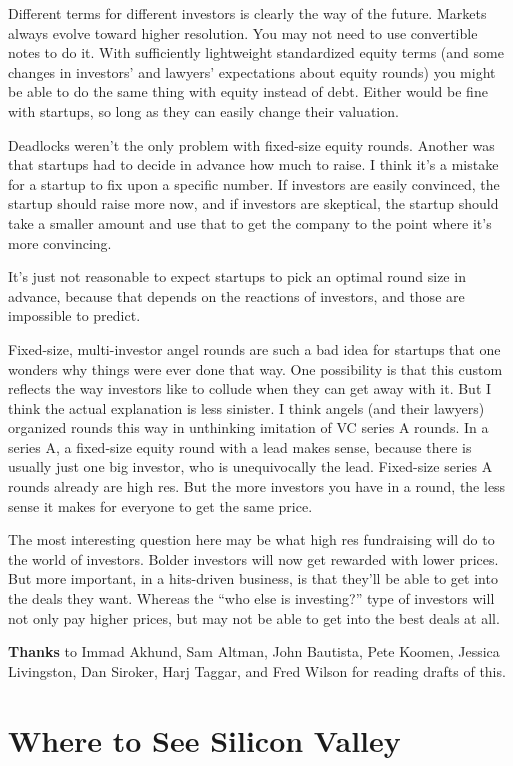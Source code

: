 \documentclass[12pt]{book}
\begin{document}
Different terms for different investors is clearly the way of the
future. Markets always evolve toward higher resolution. You may not need
to use convertible notes to do it. With sufficiently lightweight
standardized equity terms (and some changes in investors' and lawyers'
expectations about equity rounds) you might be able to do the same thing
with equity instead of debt. Either would be fine with startups, so long
as they can easily change their valuation.

Deadlocks weren't the only problem with fixed-size equity rounds.
Another was that startups had to decide in advance how much to raise. I
think it's a mistake for a startup to fix upon a specific number. If
investors are easily convinced, the startup should raise more now, and
if investors are skeptical, the startup should take a smaller amount and
use that to get the company to the point where it's more convincing.

It's just not reasonable to expect startups to pick an optimal round
size in advance, because that depends on the reactions of investors, and
those are impossible to predict.

Fixed-size, multi-investor angel rounds are such a bad idea for startups
that one wonders why things were ever done that way. One possibility is
that this custom reflects the way investors like to collude when they
can get away with it. But I think the actual explanation is less
sinister. I think angels (and their lawyers) organized rounds this way
in unthinking imitation of VC series A rounds. In a series A, a
fixed-size equity round with a lead makes sense, because there is
usually just one big investor, who is unequivocally the lead. Fixed-size
series A rounds already are high res. But the more investors you have in
a round, the less sense it makes for everyone to get the same price.

The most interesting question here may be what high res fundraising will
do to the world of investors. Bolder investors will now get rewarded
with lower prices. But more important, in a hits-driven business, is
that they'll be able to get into the deals they want. Whereas the ``who
else is investing?'' type of investors will not only pay higher prices,
but may not be able to get into the best deals at all.

\textbf{Thanks} to Immad Akhund, Sam Altman, John Bautista, Pete Koomen,
Jessica Livingston, Dan Siroker, Harj Taggar, and Fred Wilson for
reading drafts of this.
\chapter{Where to See Silicon Valley}
\end{document}
